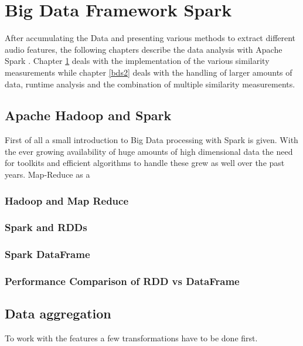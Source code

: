 
\chapter{Big Data Framework Spark}\label{bds1}

After accumulating the Data and presenting various methods to extract different audio features, the following chapters describe the data analysis with Apache Spark \cite{spark}. Chapter \ref{bds1} deals with the implementation of the various similarity measurements while chapter \ref{bds2} deals with the handling of larger amounts of data, runtime analysis and the combination of multiple similarity measurements. 

\section{Apache Hadoop and Spark} 

First of all a small introduction to Big Data processing with Spark is given.
With the ever growing availability of huge amounts of high dimensional data the need for toolkits and efficient algorithms to handle these grew as well over the past years. Map-Reduce as a 

\subsection{Hadoop and Map Reduce}

\subsection{Spark and RDDs}

\subsection{Spark DataFrame}

\subsection{Performance Comparison of RDD vs DataFrame}

\section{Data aggregation}

To work with the features a few transformations have to be done first. 


